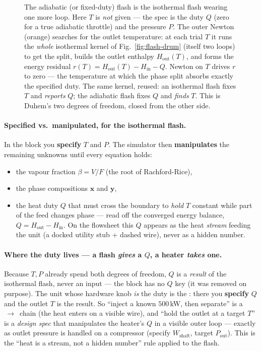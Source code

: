 \documentclass[11pt,a4paper]{article}
\newcommand{\xv}{\mathbf{x}}
\newcommand{\yv}{\mathbf{y}}
\begin{document}
\begin{figure}[ht]
\caption{The adiabatic (or fixed-duty) flash is the isothermal flash
wearing one more loop.  Here $T$ is \emph{not} given --- the spec is the
duty $Q$ (zero for a true adiabatic throttle) and the pressure $P$.  The
outer Newton (orange) searches for the outlet temperature: at each trial
$T$ it runs the \emph{whole} isothermal kernel of
Fig.~\ref{fig:flash-drum} (itself two loops) to get the split, builds the
outlet enthalpy $H_{\mathrm{out}}(T)$, and forms the energy residual
$r(T)=H_{\mathrm{out}}(T)-H_{\mathrm{in}}-Q$.  Newton on $T$ drives $r$
to zero --- the temperature at which the phase split absorbs exactly the
specified duty.  The same kernel, reused: an isothermal flash fixes $T$
and \emph{reports} $Q$; the adiabatic flash fixes $Q$ and \emph{finds}
$T$.  This is Duhem's two degrees of freedom, closed from the other
side.}
\label{fig:adiabatic-flash-loops}
\end{figure}


\paragraph{Specified vs.\ manipulated, for the isothermal flash.}  In the
 block you \textbf{specify} $T$ and $P$.  The simulator then
\textbf{manipulates} the remaining unknowns until every equation holds:

\begin{itemize}[leftmargin=*,nosep]
  \item the vapour fraction $\beta = V/F$ (the root of Rachford-Rice),
  \item the phase compositions $\xv$ and $\yv$,
  \item the heat duty $Q$ that must cross the boundary to \emph{hold} $T$
        constant while part of the feed changes phase --- read off the
        converged energy balance, $Q = H_{\text{out}} - H_{\text{in}}$.  On the
        flowsheet this $Q$ appears as the heat \emph{stream} feeding the unit
        (a docked utility stub + dashed wire), never as a hidden number.
\end{itemize}

\paragraph{Where the duty lives --- a flash \emph{gives} a $Q$, a heater
\emph{takes} one.}  Because $T,P$ already spend both degrees of freedom, $Q$ is a
\emph{result} of the isothermal flash, never an input --- the 
block has no $Q$ key (it was removed on purpose).  The unit whose hardware knob
\emph{is} the duty is the : there you \textbf{specify} $Q$ and the
outlet $T$ is the result.  So ``inject a known $500\,$kW, then separate'' is a
$\,\to\,$ chain (the heat enters on a visible wire), and
``hold the outlet at a target $T$'' is a \emph{design spec} that manipulates the
heater's $Q$ in a visible outer loop --- exactly as outlet pressure is handled on
a compressor (specify $W_{\text{shaft}}$, target $P_{\text{out}}$).  This is the
``heat is a stream, not a hidden number'' rule applied to the flash.
\end{document}
